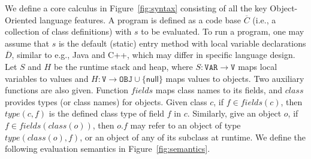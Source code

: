 \documentclass{llncs}
\newcommand\set[1]{\{#1\}}
\newcommand{\keyword}[1]{\mathsf{#1}}
\newcommand{\kwnull}[0]{\keyword{null}}
\newcommand\Var{\mathtt{VAR}}
\newcommand\Val{\mathtt{V}}
\newcommand\Obj{\mathtt{OBJ}}
\begin{document}
We define a core calculus in Figure~\ref{fig:syntax} consisting of all the key Object-Oriented language features.
A program is defined as a code base $\overline{C}$ (i.e., a collection of class definitions) with $s$ to be evaluated.
To run a program, one may assume that $s$ is the default (static) entry method with local variable declarations $\overline{D}$,
similar to e.g., Java and C++,
which may differ in specific language design. Let $S$ and $H$ be the runtime stack and heap, where $S:\Var\rightarrow \Val$
maps local variables to values and $H:\Val\rightarrow \Obj\cup\set{\kwnull}$ maps values to objects.
Two auxiliary functions are also given. Function $fields$ maps class names to its fields, and $class$ provides types (or class names)
for objects.
Given class $c$, if $f\in fields(c)$, then $type(c,f)$ is the defined class type of field $f$ in $c$. Similarly, give an object $o$,
if $f\in fields(class(o))$, then $o.f$ may refer to an object of type $type(class(o),f)$, or an object of any of its subclass at runtime.
We define the following evaluation semantics in Figure~\ref{fig:semantics}.

\end{document}
